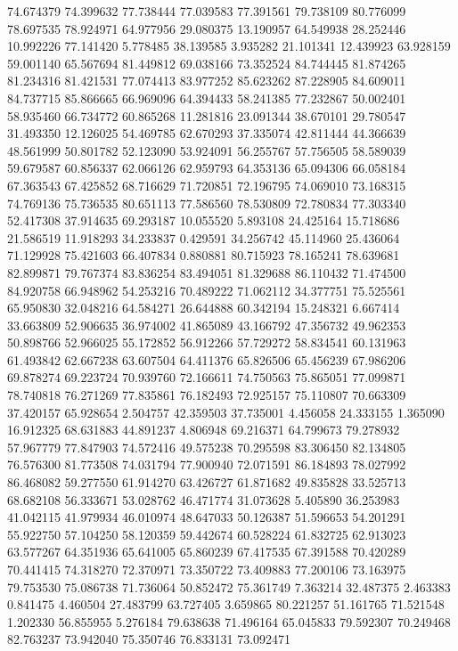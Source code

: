 74.674379
74.399632
77.738444
77.039583
77.391561
79.738109
80.776099
78.697535
78.924971
64.977956
29.080375
13.190957
64.549938
28.252446
10.992226
77.141420
5.778485
38.139585
3.935282
21.101341
12.439923
63.928159
59.001140
65.567694
81.449812
69.038166
73.352524
84.744445
81.874265
81.234316
81.421531
77.074413
83.977252
85.623262
87.228905
84.609011
84.737715
85.866665
66.969096
64.394433
58.241385
77.232867
50.002401
58.935460
66.734772
60.865268
11.281816
23.091344
38.670101
29.780547
31.493350
12.126025
54.469785
62.670293
37.335074
42.811444
44.366639
48.561999
50.801782
52.123090
53.924091
56.255767
57.756505
58.589039
59.679587
60.856337
62.066126
62.959793
64.353136
65.094306
66.058184
67.363543
67.425852
68.716629
71.720851
72.196795
74.069010
73.168315
74.769136
75.736535
80.651113
77.586560
78.530809
72.780834
77.303340
52.417308
37.914635
69.293187
10.055520
5.893108
24.425164
15.718686
21.586519
11.918293
34.233837
0.429591
34.256742
45.114960
25.436064
71.129928
75.421603
66.407834
0.880881
80.715923
78.165241
78.639681
82.899871
79.767374
83.836254
83.494051
81.329688
86.110432
71.474500
84.920758
66.948962
54.253216
70.489222
71.062112
34.377751
75.525561
65.950830
32.048216
64.584271
26.644888
60.342194
15.248321
6.667414
33.663809
52.906635
36.974002
41.865089
43.166792
47.356732
49.962353
50.898766
52.966025
55.172852
56.912266
57.729272
58.834541
60.131963
61.493842
62.667238
63.607504
64.411376
65.826506
65.456239
67.986206
69.878274
69.223724
70.939760
72.166611
74.750563
75.865051
77.099871
78.740818
76.271269
77.835861
76.182493
72.925157
75.110807
70.663309
37.420157
65.928654
2.504757
42.359503
37.735001
4.456058
24.333155
1.365090
16.912325
68.631883
44.891237
4.806948
69.216371
64.799673
79.278932
57.967779
77.847903
74.572416
49.575238
70.295598
83.306450
82.134805
76.576300
81.773508
74.031794
77.900940
72.071591
86.184893
78.027992
86.468082
59.277550
61.914270
63.426727
61.871682
49.835828
33.525713
68.682108
56.333671
53.028762
46.471774
31.073628
5.405890
36.253983
41.042115
41.979934
46.010974
48.647033
50.126387
51.596653
54.201291
55.922750
57.104250
58.120359
59.442674
60.528224
61.832725
62.913023
63.577267
64.351936
65.641005
65.860239
67.417535
67.391588
70.420289
70.441415
74.318270
72.370971
73.350722
73.409883
77.200106
73.163975
79.753530
75.086738
71.736064
50.852472
75.361749
7.363214
32.487375
2.463383
0.841475
4.460504
27.483799
63.727405
3.659865
80.221257
51.161765
71.521548
1.202330
56.855955
5.276184
79.638638
71.496164
65.045833
79.592307
70.249468
82.763237
73.942040
75.350746
76.833131
73.092471
